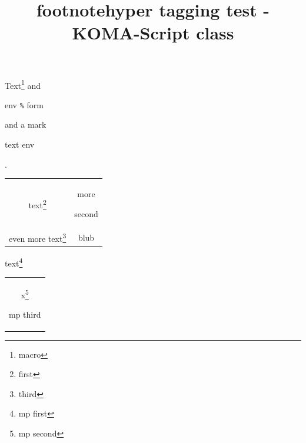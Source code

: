 \documentclass{scrartcl}
\title{footnotehyper tagging test - KOMA-Script class}
\begin{document}
Text\footnote{macro} and\begin{footnote}env \verb|%| form\end{footnote} and a
mark\footnotemark\begin{footnotetext}text env\end{footnotetext}.

\begin{savenotes}
\begin{tabular}{cc}
text\footnote{first} & more\begin{footnote}second\end{footnote} \\
even more text\footnote{third} & blub
\end{tabular}
\end{savenotes}

\begin{minipage}{5cm}
text\footnote{mp first}
\begin{savenotes}
\begin{tabular}{c}
x\footnote{mp second}\begin{footnote}mp third\end{footnote}
\end{tabular}
\end{savenotes}
\end{minipage}
\end{document}
